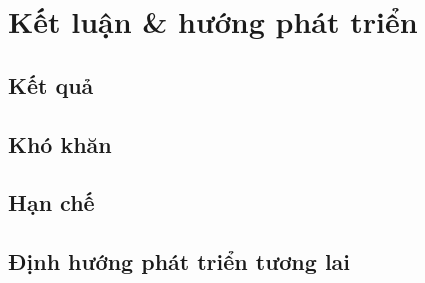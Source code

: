 \section{Kết luận \& hướng phát triển}
\subsection{Kết quả}

\subsection{Khó khăn}

\subsection{Hạn chế}

\subsection{Định hướng phát triển tương lai}
